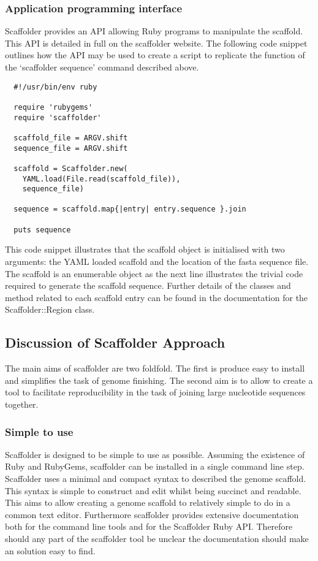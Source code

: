 \documentclass[10pt]{bmc_article}
\newenvironment{bmcformat}{\begin{raggedright}\baselineskip20pt\sloppy\setboolean{publ}{false}}{\end{raggedright}\baselineskip20pt\sloppy}
\begin{document}
\begin{bmcformat}
\subsubsection*{Application programming interface} %

Scaffolder provides an API allowing Ruby programs to manipulate the scaffold.
This API is detailed in full on the scaffolder website. The following code
snippet outlines how the API may be used to create a script to replicate the
function of the `scaffolder sequence' command described above. \pb

\begin{verbatim}
  #!/usr/bin/env ruby

  require 'rubygems'
  require 'scaffolder'

  scaffold_file = ARGV.shift
  sequence_file = ARGV.shift

  scaffold = Scaffolder.new(
    YAML.load(File.read(scaffold_file)),
    sequence_file)

  sequence = scaffold.map{|entry| entry.sequence }.join

  puts sequence
\end{verbatim}

This code snippet illustrates that the scaffold object is initialised with two
arguments: the YAML loaded scaffold and the location of the fasta sequence
file. The scaffold is an enumerable object as the next line illustrates the
trivial code required to generate the scaffold sequence. Further details of
the classes and method related to each scaffold entry can be found in the
documentation for the Scaffolder::Region class. \pb

\subsection*{Discussion of Scaffolder Approach} %

The main aims of scaffolder are two foldfold. The first is produce easy to
install and simplifies the task of genome finishing. The second aim is to
allow to create a tool to facilitate reproducibility in the task of joining
large nucleotide sequences together. \pb

\subsubsection{Simple to use}

Scaffolder is designed to be simple to use as possible. Assuming the existence
of Ruby and RubyGems, scaffolder can be installed in a single command line
step. Scaffolder uses a minimal and compact syntax to described the genome
scaffold. This syntax is simple to construct and edit whilst being succinct
and readable. This aims to allow creating a genome scaffold to relatively
simple to do in a common text editor. Furthermore scaffolder provides
extensive documentation both for the command line tools and for the Scaffolder
Ruby API. Therefore should any part of the scaffolder tool be unclear the
documentation should make an solution easy to find. \pb


\end{bmcformat}
\end{document}
